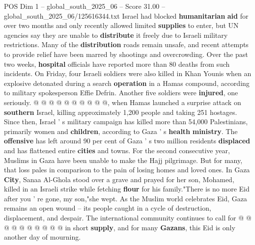 \begin{textsample}{POS Dim 1 – global\_south\_2025\_06 – Score 31.00 – global\_south\_2025\_06/125616344.txt}
Israel had blocked \textbf{humanitarian} \textbf{aid} for over two months and only recently allowed limited \textbf{supplies} to enter, but UN agencies say they are unable to \textbf{distribute} it freely due to Israeli military restrictions.
Many of the \textbf{distribution} roads remain unsafe, and recent attempts to provide relief have been marred by shootings and overcrowding.
Over the past two weeks, \textbf{hospital} officials have reported more than 80 deaths from such incidents.
On Friday, four Israeli soldiers were also killed in Khan Younis when an explosive detonated during a search \textbf{operation} in a Hamas compound, according to military spokesperson Effie Defrin.
Another five soldiers were \textbf{injured}, one seriously. @ @ @ @ @ @ @ @ @ @, when Hamas launched a surprise attack on \textbf{southern} Israel, killing approximately 1,200 people and taking 251 hostages.
Since then, Israel ' s military campaign has killed more than 54,000 Palestinians, primarily women and \textbf{children}, according to Gaza ' s \textbf{health} \textbf{ministry}.
The \textbf{offensive} has left around 90 per cent of Gaza ' s two million residents \textbf{displaced} and has flattened entire \textbf{cities} and towns.
For the second consecutive year, Muslims in Gaza have been unable to make the Hajj pilgrimage.
But for many, that loss pales in comparison to the pain of losing homes and loved ones.
In Gaza \textbf{City}, Sanaa Al-Ghola stood over a grave and prayed for her son, Mohamed, killed in an Israeli strike while fetching \textbf{flour} for his family."There is no more Eid after you ' re gone, my son,"she wept.
As the Muslim world celebrates Eid, Gaza remains an open wound -- its people caught in a cycle of destruction, displacement, and despair.
The international community continues to call for @ @ @ @ @ @ @ @ @ @ in short \textbf{supply}, and for many \textbf{Gazans}, this Eid is only another day of mourning.

\end{textsample}
